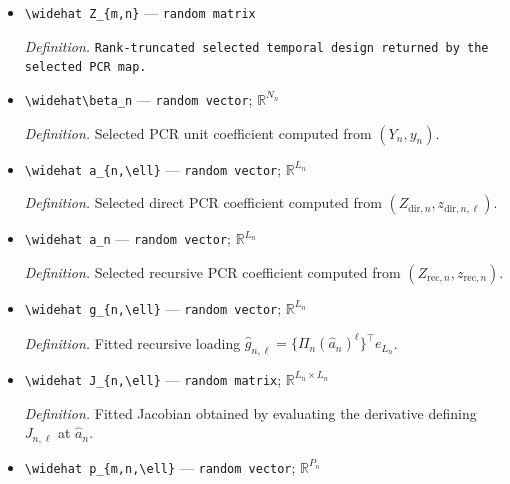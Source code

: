 \documentclass{article}
\begin{document}
\begin{itemize}
  \par\smallskip\noindent\emph{Definition.} \texttt{Remainder vector in the selected path linearization.}
  \item \texttt{\textbackslash{}\allowbreak{}widehat Z\_\allowbreak{}\{m,\allowbreak{}n\}\allowbreak{}} --- \texttt{random matrix}
  \par\smallskip\noindent\emph{Definition.} \texttt{Rank-\allowbreak{}truncated selected temporal design returned by the selected PCR map.}
  \item \texttt{\textbackslash{}\allowbreak{}widehat\textbackslash{}\allowbreak{}beta\_\allowbreak{}n} --- \texttt{random vector}; \(\mathbb R^{N_n}\)
  \par\smallskip\noindent\emph{Definition.} Selected PCR unit coefficient computed from \((Y_n,y_n)\).
  \item \texttt{\textbackslash{}\allowbreak{}widehat a\_\allowbreak{}\{n,\allowbreak{}\textbackslash{}\allowbreak{}ell\}\allowbreak{}} --- \texttt{random vector}; \(\mathbb R^{L_n}\)
  \par\smallskip\noindent\emph{Definition.} Selected direct PCR coefficient computed from \((Z_{\mathrm{dir},n},z_{\mathrm{dir},n,\ell})\).
  \item \texttt{\textbackslash{}\allowbreak{}widehat a\_\allowbreak{}n} --- \texttt{random vector}; \(\mathbb R^{L_n}\)
  \par\smallskip\noindent\emph{Definition.} Selected recursive PCR coefficient computed from \((Z_{\mathrm{rec},n},z_{\mathrm{rec},n})\).
  \item \texttt{\textbackslash{}\allowbreak{}widehat g\_\allowbreak{}\{n,\allowbreak{}\textbackslash{}\allowbreak{}ell\}\allowbreak{}} --- \texttt{random vector}; \(\mathbb R^{L_n}\)
  \par\smallskip\noindent\emph{Definition.} Fitted recursive loading \(\widehat g_{n,\ell}=\{\Pi_n(\widehat a_n)^\ell\}^{\top}e_{L_n}\).
  \item \texttt{\textbackslash{}\allowbreak{}widehat J\_\allowbreak{}\{n,\allowbreak{}\textbackslash{}\allowbreak{}ell\}\allowbreak{}} --- \texttt{random matrix}; \(\mathbb R^{L_n\times L_n}\)
  \par\smallskip\noindent\emph{Definition.} Fitted Jacobian obtained by evaluating the derivative defining \(J_{n,\ell}\) at \(\widehat a_n\).
  \item \texttt{\textbackslash{}\allowbreak{}widehat p\_\allowbreak{}\{m,\allowbreak{}n,\allowbreak{}\textbackslash{}\allowbreak{}ell\}\allowbreak{}} --- \texttt{random vector}; \(\mathbb R^{P_n}\)

\end{itemize}
\end{document}
